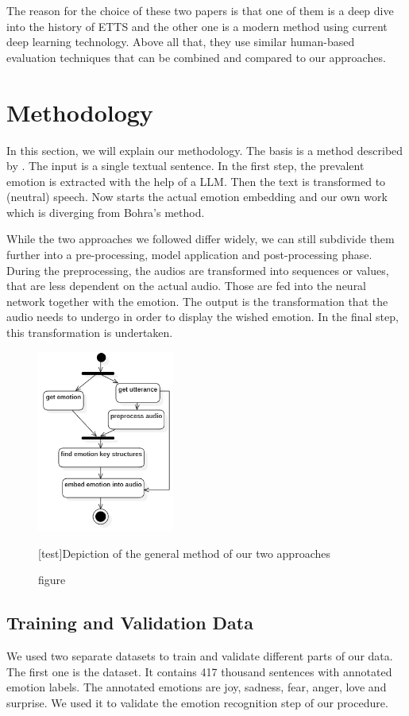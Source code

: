 \documentclass[11pt]{article}
\begin{document}

The reason for the choice of these two papers is that one of them is a deep dive into the history of ETTS and the other one is a modern method using current deep learning technology. Above all that, they use similar human-based evaluation techniques that can be combined and compared to our approaches.

\section{Methodology}
\label{methodology}
In this section, we will explain our methodology. The basis is a method described by \cite{bohra_smart_2022}. The input is a single textual sentence. In the first step, the prevalent emotion is extracted with the help of a LLM. Then the text is transformed to (neutral) speech. Now starts the actual emotion embedding and our own work which is diverging from Bohra's method.

While the two approaches we followed differ widely, we can still subdivide them further into a pre-processing, model application and post-processing phase. During the preprocessing, the audios are transformed into sequences or values, that are less dependent on the actual audio. Those are fed into the neural network together with the emotion. The output is the transformation that the audio needs to undergo in order to display the wished emotion. In the final step, this transformation is undertaken.

\begin{figure}[h]
 \centering
\includegraphics[width=0.4\textwidth]{"Bilder/Prozess.PNG"}
\caption{figure}[test]{Depiction of the general method of our two approaches}
\label{Ablauf}
\end{figure}

\subsection{Training and Validation Data}
We used two separate datasets to train and validate different parts of our data.
The first one is the \cite{saravia-etal-2018-carer} dataset. It contains 417 thousand sentences with annotated emotion labels. The annotated emotions are joy, sadness, fear, anger, love and surprise. We used it to validate the emotion recognition step of our procedure.
\end{document}
